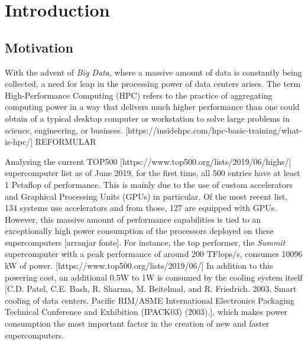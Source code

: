 
\chapter{Introduction}
\label{chapter:introduction}


\section{Motivation}
\label{section:motivation}

With the advent of \textit{Big Data}, where a massive amount of data is constantly being collected, a need for leap in the processing power of data centers arises. The term High-Performance Computing (HPC) refers to the practice of aggregating computing power in a way that delivers much higher performance than one could obtain of a typical desktop computer or workstation to solve large problems in science, engineering, or business. [https://insidehpc.com/hpc-basic-training/what-is-hpc/] REFORMULAR

Analyzing the current TOP500 [https://www.top500.org/lists/2019/06/highs/]  supercomputer list as of June 2019, for the first time, all 500 entries have at least 1 Petaflop of performance. This is mainly due to the use of custom accelerators and Graphical Processing Units (GPUs) in particular. Of the most recent list, 134 systems use accelerators and from those, 127 are equipped with GPUs. However, this massive amount of performance capabilities is tied to an exceptionally high power consumption of the processors deployed on these supercomputers [arranjar fonte]. For instance, the top performer, the \textit{Summit} supercomputer with a peak performance of around 200 TFlops/s, consumes 10096 kW of power. [https://www.top500.org/lists/2019/06/] In addition to this powering cost, an additional 0.5W to 1W is consumed by the cooling system itself [C.D. Patel, C.E. Bash, R. Sharma, M. Beitelmal, and R. Friedrich. 2003. Smart cooling of data centers. Pacific RIM/ASME International Electronics Packaging Technical Conference and Exhibition (IPACK03) (2003).], which makes power consumption the most important factor in the creation of new and faster supercomputers.

